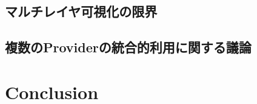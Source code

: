 \documentclass[11pt,a4paper]{jlreq}
\begin{document}
\subsection{マルチレイヤ可視化の限界}

\subsection{複数のProviderの統合的利用に関する議論}


\section{Conclusion}
\label{sec:conclusion}




\end{document}
